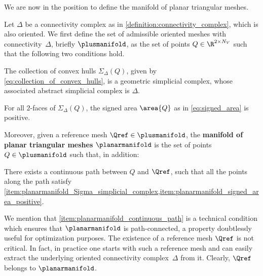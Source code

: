 We are now in the position to define the manifold of planar triangular meshes.
\begin{definition}
	\label{definition:planarmanifold}
	Let $\Delta$ be a connectivity complex as in \cref{definition:connectivity_complex}, which is also oriented.
	We first define the set of admissible oriented meshes with connectivity~$\Delta$, briefly $\plusmanifold$, as the set of points $Q \in \R^{2\times N_V}$ such that the following two conditions hold.
	\begin{enumeratelatin}
		\item
			\label{item:planarmanifold_Sigma_simplicial_complex}
			The collection of convex hulls $\Sigma_\Delta(Q)$, given by \eqref{eq:collection_of_convex_hulls}, is a geometric simplicial complex, whose associated abstract simplicial complex is $\Delta$.
		\item
			\label{item:planarmanifold_signed_area_positive}
			For all $2$-faces of $\Sigma_\Delta(Q)$, the signed area $\area{Q}$ as in \eqref{eq:signed_area} is positive.
	\end{enumeratelatin}
	Moreover, given a reference mesh $\Qref \in \plusmanifold$, the \textbf{manifold of planar triangular meshes} $\planarmanifold$ is the set of points $Q \in \plusmanifold$ such that, in addition:
	\begin{enumeratelatin}[resume]
		\item
			\label{item:planarmanifold_continuous_path}
			There exists a continuous path between $Q$ and $\Qref$, such that all the points along the path satisfy \cref{item:planarmanifold_Sigma_simplicial_complex,item:planarmanifold_signed_area_positive}.
	\end{enumeratelatin}
\end{definition}
We mention that \cref{item:planarmanifold_continuous_path} is a technical condition which ensures that $\planarmanifold$ is path-connected, a property doubtlessly useful for optimization purposes.
The existence of a reference mesh $\Qref$ is not critical.
In fact, in practice one starts with such a reference mesh and can easily extract the underlying oriented connectivity complex~$\Delta$ from it.
Clearly, $\Qref$ belongs to $\planarmanifold$.

